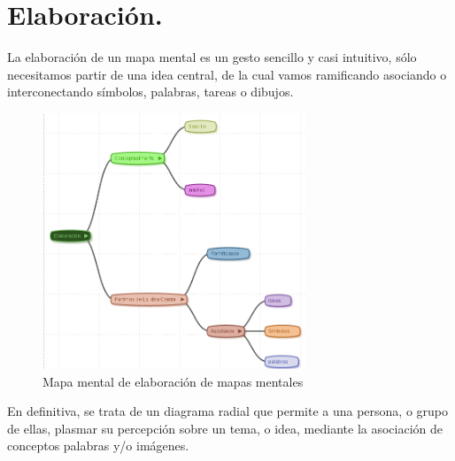\section{Elaboración.}

La elaboración de un mapa mental es un gesto sencillo y casi intuitivo, sólo necesitamos partir de una idea central, de la cual vamos ramificando asociando o interconectando símbolos, palabras, tareas o dibujos. 

\begin{figure}[htbp]
\centering
\includegraphics[width=0.7\textwidth]{imagenes/Elaboracion.png}
\caption{Mapa mental de elaboración de mapas mentales}
\label{fig:elaboracion}
\end{figure}

En definitiva, se trata de un diagrama radial que permite a una persona, o grupo de ellas,  plasmar su percepción sobre un tema, o idea, mediante la asociación de conceptos palabras y/o imágenes.

